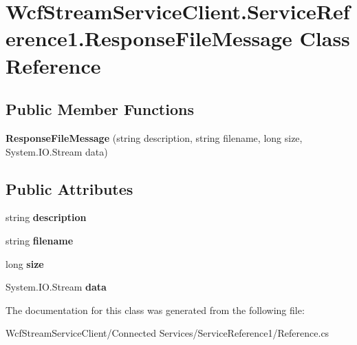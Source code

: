 \hypertarget{class_wcf_stream_service_client_1_1_service_reference1_1_1_response_file_message}{}\section{Wcf\+Stream\+Service\+Client.\+Service\+Reference1.\+Response\+File\+Message Class Reference}
\label{class_wcf_stream_service_client_1_1_service_reference1_1_1_response_file_message}
\subsection*{Public Member Functions}
\begin{DoxyCompactItemize}
\item 
\mbox{\label{class_wcf_stream_service_client_1_1_service_reference1_1_1_response_file_message_a570ba7a23e365b3b66c2574b03e74af1}} 
{\bfseries Response\+File\+Message} (string description, string filename, long size, System.\+I\+O.\+Stream data)
\end{DoxyCompactItemize}
\subsection*{Public Attributes}
\begin{DoxyCompactItemize}
\item 
\mbox{\label{class_wcf_stream_service_client_1_1_service_reference1_1_1_response_file_message_a5713e66de6702d21e68e22d7d686e0d3}} 
string {\bfseries description}
\item 
\mbox{\label{class_wcf_stream_service_client_1_1_service_reference1_1_1_response_file_message_a89fafd5ad7d1a2ffe2d1ad27d6f9f152}} 
string {\bfseries filename}
\item 
\mbox{\label{class_wcf_stream_service_client_1_1_service_reference1_1_1_response_file_message_ac4d37eed227a5e1d351f18d7b14105f3}} 
long {\bfseries size}
\item 
\mbox{\label{class_wcf_stream_service_client_1_1_service_reference1_1_1_response_file_message_a981c5aa736ff513724ca6cbb2f3e3bc0}} 
System.\+I\+O.\+Stream {\bfseries data}
\end{DoxyCompactItemize}


The documentation for this class was generated from the following file\+:\begin{DoxyCompactItemize}
\item 
Wcf\+Stream\+Service\+Client/\+Connected Services/\+Service\+Reference1/Reference.\+cs\end{DoxyCompactItemize}
